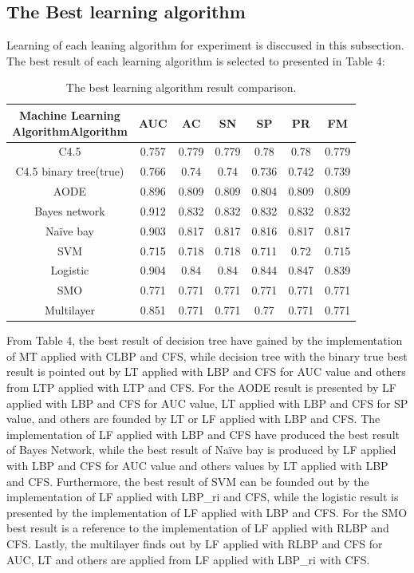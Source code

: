 \documentclass[review]{elsarticle}
\begin{document}
\subsection{The Best learning algorithm }
Learning of each leaning algorithm for experiment is disccused in this subsection. The best result of each learning algorithm is selected to presented in Table 4: 
\begin{table}[h!]
	\centering
	\begin{tabular}{|c|c|c|c|c|c|c|}
		\hline 
		\backslashbox{Machine Learning \\ Algorithm}{Algorithm} &AUC&AC&SN&SP&PR&FM\\
		\hline  
		C4.5		&0.757&	0.779&	0.779&	0.78&	0.78&	0.779\\
		\hline
		C4.5 binary tree(true)	&0.766	&0.74	&0.74	&0.736	&0.742	&0.739 \\
		\hline 
		AODE	&0.896	&0.809	&0.809	&0.804	&0.809	&0.809 \\
		\hline 
	\cellcolor{blue!25}	Bayes network	& \cellcolor{blue!25}0.912	& \cellcolor{blue!25}0.832	& \cellcolor{blue!25}0.832	& \cellcolor{blue!25}0.832	& \cellcolor{blue!25}0.832	& \cellcolor{blue!25}0.832\\
		\hline 
		Naïve bay	&0.903	&0.817	&0.817	&0.816	&0.817	&0.817 \\
		\hline 
		SVM			&0.715	&0.718	&0.718	&0.711	&0.72	&0.715 \\
		\hline 
		Logistic	&0.904	&0.84	&0.84	&0.844	&0.847	&0.839 \\
		\hline 
		SMO			&0.771	&0.771	&0.771	&0.771	&0.771	&0.771 \\
		\hline 
		Multilayer	&0.851	&0.771	&0.771	&0.77	&0.771	&0.771 \\
		\hline 
	\end{tabular} 
	\caption{The best learning algorithm result comparison. }
\end{table}

From Table 4, the best result of decision tree have gained by the implementation of MT applied with CLBP and CFS, while decision tree with the binary true best result is pointed out by LT applied with LBP and CFS for AUC value and others from LTP applied with LTP and CFS. For the AODE result is presented by LF applied with LBP and CFS for AUC value, LT applied with LBP and CFS for SP value, and others are founded by LT or LF applied with LBP and CFS. The implementation of LF applied with LBP and CFS have produced the best result of Bayes Network, while the best result of Naïve bay is produced by LF applied with LBP and CFS for AUC value and others values by LT applied with LBP and CFS. Furthermore, the best result of SVM can be founded out by the implementation of LF applied with LBP\_ri and CFS, while the logistic result is presented by the implementation of LF applied with LBP and CFS. For the SMO best result is a reference to the implementation of LF applied with RLBP and CFS. Lastly, the multilayer finds out by LF applied with RLBP and CFS for AUC, LT and others are applied from LF applied with LBP\_ri with CFS.
\end{document}
